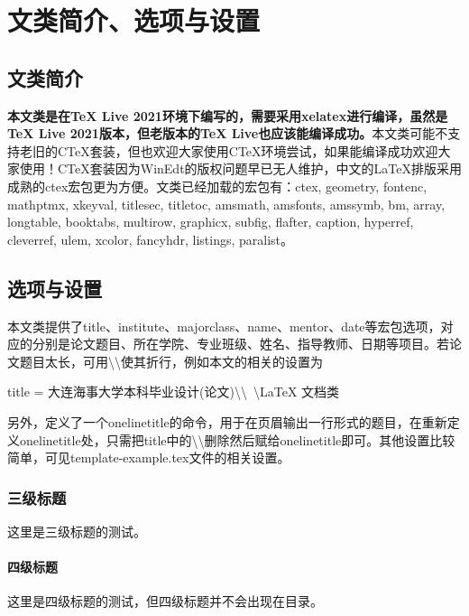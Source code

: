 \centerline{\bf{}\onelinetitle}
\section{文类简介、选项与设置}
\subsection{文类简介}
\textbf{本文类是在TeX Live 2021环境下编写的，需要采用xelatex进行编译，虽然是TeX Live 2021版本，但老版本的TeX Live也应该能编译成功。}本文类可能不支持老旧的CTeX套装，但也欢迎大家使用CTeX环境尝试，如果能编译成功欢迎大家使用！CTeX套装因为WinEdt的版权问题早已无人维护，中文的LaTeX排版采用成熟的ctex宏包更为方便。文类已经加载的宏包有：ctex, geometry, fontenc, mathptmx, xkeyval, titlesec, titletoc, amsmath, amsfonts, amssymb, bm, array, longtable, booktabs, multirow, graphicx, subfig, flafter, caption, hyperref, cleverref, ulem, xcolor, fancyhdr, listings, paralist。
\subsection{选项与设置}
本文类提供了title、institute、majorclass、name、mentor、date等宏包选项，对应的分别是论文题目、所在学院、专业班级、姓名、指导教师、日期等项目。若论文题目太长，可用\textbackslash\textbackslash 使其折行，例如本文的相关的设置为

\centerline{title = 大连海事大学本科毕业设计(论文)\textbackslash\textbackslash\ \textbackslash LaTeX 文档类}

另外，定义了一个onelinetitle的命令，用于在页眉输出一行形式的题目，在重新定义onelinetitle处，只需把title中的\textbackslash\textbackslash 删除然后赋给onelinetitle即可。其他设置比较简单，可见template-example.tex文件的相关设置。
\subsubsection{三级标题}
这里是三级标题的测试。
\paragraph{四级标题}
这里是四级标题的测试，但四级标题并不会出现在目录。